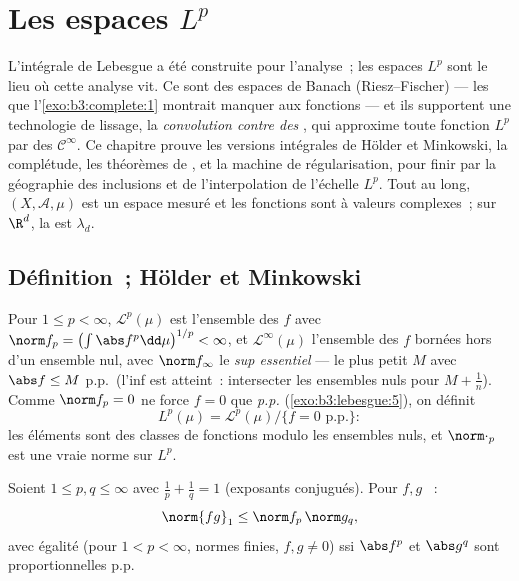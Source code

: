 \chapter{Les espaces \texorpdfstring{$L^p$}{Lp}}\label{ch:b3:lp}

L'intégrale de Lebesgue a été construite pour l'analyse~; les
espaces $L^p$ sont le lieu où cette analyse vit. Ce sont des
espaces de Banach (Riesz--Fischer) --- les  que
l'\cref{exo:b3:complete:1} montrait manquer aux fonctions
 --- et ils supportent une technologie de
lissage, la \emph{convolution contre des }, qui
approxime toute fonction $L^p$ par des $\mathcal C^\infty$.
Ce chapitre prouve les versions intégrales de Hölder et
Minkowski, la complétude, les théorèmes de , et la
machine de régularisation, pour finir par la géographie des
inclusions et de l'interpolation de l'échelle $L^p$. Tout au
long, $(X, \mathcal A, \mu)$ est un espace mesuré et les
fonctions sont à valeurs complexes~; sur $\R^d$, la  est
$\lambda_d$.

\section{Définition~; Hölder et Minkowski}

\begin{definition}\label{def:b3:lp:space}
Pour $1 \leq p < \infty$, $\mathcal L^p(\mu)$ est l'ensemble
des $f$  avec $\norm f_p = \bigl(\int\abs
f^p\dd\mu\bigr)^{1/p} < \infty$, et $\mathcal L^\infty(\mu)$
l'ensemble des $f$ bornées hors d'un ensemble nul, avec
$\norm f_\infty$ le \emph{sup essentiel} --- le plus petit $M$
avec $\abs f \leq M$ p.p.\ (l'inf est atteint~: intersecter les
ensembles nuls pour $M + \frac1n$). Comme $\norm f_p = 0$ ne
force $f = 0$ que \emph{p.p.}
(\cref{exo:b3:lebesgue:5}), on définit
\[
L^p(\mu) = \mathcal L^p(\mu)/\{f = 0 \text{ p.p.}\} :
\]
les éléments sont des classes de fonctions modulo les
ensembles nuls, et $\norm\cdot_p$ est une vraie norme sur
$L^p$.
\end{definition}

\begin{theorem}\label{thm:b3:lp:holder}
Soient $1 \leq p, q \leq \infty$ avec $\frac1p + \frac1q = 1$
(exposants conjugués). Pour $f, g$ ~:
\[
\norm{fg}_1 \leq \norm f_p\,\norm g_q ,
\]
avec égalité (pour $1 < p < \infty$, normes finies, $f,g\ne0$)
ssi $\abs f^p$ et $\abs g^q$ sont proportionnelles p.p.
\end{theorem}

